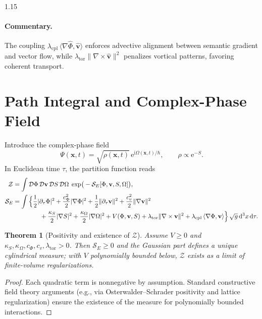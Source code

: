 \documentclass[12pt,a4paper]{article}
\numberwithin{equation}{section}
\theoremstyle{definition}
\theoremstyle{plain}
\newtheorem{theorem}{Theorem}[section]
\theoremstyle{remark}
\newcommand{\hPhi}{\hat{\Phi}}
\newcommand{\hv}{\hat{\mathbf{v}}}
\newcommand{\D}{\mathrm{d}}
\newcommand{\e}{\mathrm{e}}
\newcommand{\ii}{\mathrm{i}}
\begin{document}
\begin{spacing}{1.15}
\paragraph{Commentary.}
The coupling $\lambda_\mathrm{cpl}\,\langle \nabla\hPhi,\hv\rangle$ enforces advective alignment between semantic gradient and vector flow, while $\lambda_\mathrm{tor}\|\nabla\times\hv\|^2$ penalizes vortical patterns, favoring coherent transport.

\section{Path Integral and Complex-Phase Field}\label{sec:path}
Introduce the complex-phase field
\begin{equation}
\Psi(\mathbf{x},t)= \sqrt{\rho(\mathbf{x},t)}\,\e^{\ii \Omega(\mathbf{x},t)/\hbar},
\qquad \rho\propto \e^{-S}.
\end{equation}
In Euclidean time $\tau$, the partition function reads
\begin{align}
\mathcal{Z} &= \int \mathcal{D}\Phi\,\mathcal{D}\mathbf{v}\,\mathcal{D}S\,\mathcal{D}\Omega\;
\exp\!\big(-\mathcal{S}_E[\Phi,\mathbf{v},S,\Omega]\big),\\
\mathcal{S}_E &= \int \Big\{
\frac{1}{2}|\partial_\tau \Phi|^2 + \frac{c_\Phi^2}{2}|\nabla \Phi|^2 
+ \frac{1}{2}\|\partial_\tau \mathbf{v}\|^2 + \frac{c_v^2}{2}\|\nabla \mathbf{v}\|^2 \nonumber\\
&\hspace{4.3em}
+ \frac{\kappa_S}{2}|\nabla S|^2 + \frac{\kappa_\Omega}{2}|\nabla \Omega|^2 
+ V(\Phi,\mathbf{v},S) + \lambda_\mathrm{tor}\|\nabla\times\mathbf{v}\|^2 
+ \lambda_\mathrm{cpl}\,\langle \nabla \Phi,\mathbf{v}\rangle
\Big\}\,\sqrt{g}\,\D^3x\,\D\tau.
\end{align}

\begin{theorem}[Positivity and existence of $\mathcal{Z}$]\label{thm:positivity}
Assume $V\ge 0$ and $\kappa_S,\kappa_\Omega,c_\Phi,c_v,\lambda_\mathrm{tor}>0$. Then $\mathcal{S}_E\ge 0$ and the Gaussian part defines a unique cylindrical measure; with $V$ polynomially bounded below, $\mathcal{Z}$ exists as a limit of finite-volume regularizations.
\end{theorem}
\begin{proof}
Each quadratic term is nonnegative by assumption. Standard constructive field theory arguments (e.g., via Osterwalder--Schrader positivity and lattice regularization) ensure the existence of the measure for polynomially bounded interactions.
\end{proof}


\end{spacing}
\end{document}
